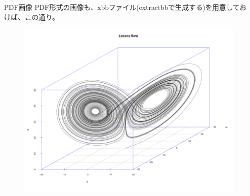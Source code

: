 \documentclass[dvipdfmx]{beamer}
\begin{document}
\begin{frame}{PDF画像}
PDF形式の画像も、xbbファイル(extractbbで生成する)を用意しておけば、この通り。
\begin{figure}
\includegraphics[scale=0.21]{image/lorenz_flow.pdf}
\end{figure}
\end{frame}
\end{document}
